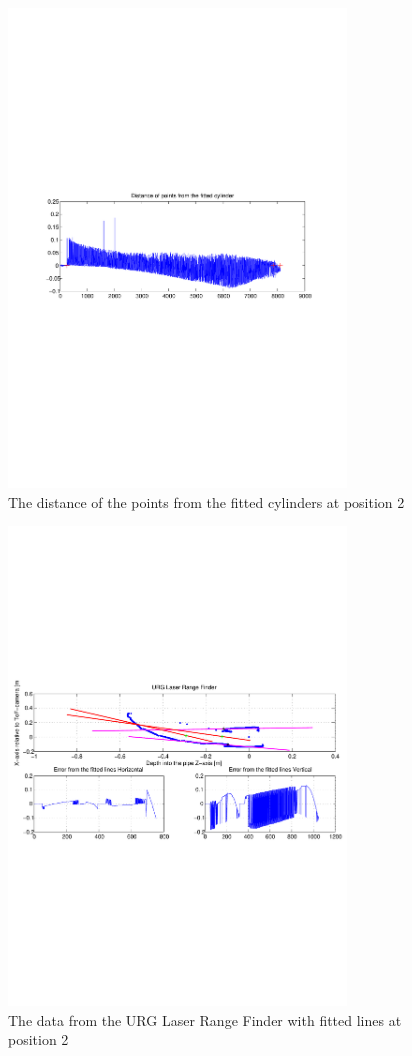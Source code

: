 \begin{figure}[htbp]
    \centering
    \includegraphics[width=0.8\textwidth]{pics/pos21-control-tof-dist}
    \caption{The distance of the points from the fitted cylinders at position 2}
    \label{chap7:fig-pos21-control-tof-dits}
\end{figure}
\begin{figure}[htbp]
    \centering
    \includegraphics[width=0.8\textwidth]{pics/pos21-control-urg-2d}
    \caption{The data from the URG Laser Range Finder with fitted lines at position 2}
    \label{chap7:fig-pos21-control-urg-2d}
\end{figure}


